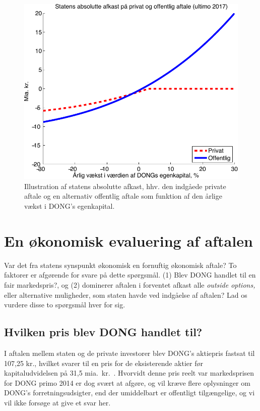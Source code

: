 \documentclass{article}
\begin{document}
\begin{figure}
\caption{Illustration af statens absolutte afkast, hhv. den indg\aa{}ede private aftale og en alternativ offentlig aftale som funktion af den \aa{}rlige v\ae{}kst i DONG's egenkapital. }
\label{fig:privat_off}
\centerline{\includegraphics[scale=0.8]{../matlab/figs/private_public_deal_guan}}
\end{figure}


\section{En økonomisk evaluering af aftalen}

Var det fra statens synspunkt økonomisk en fornuftig økonomisk aftale? To faktorer er afgørende for svare på dette spørgsmål. (1) Blev DONG handlet til en fair markedspris?, og (2) dominerer aftalen i forventet afkast  alle \emph{outside options,} eller alternative muligheder, som staten havde ved indgåelse af aftalen? Lad os vurdere disse to spørgsmål hver for sig.

\subsection{Hvilken pris blev DONG handlet til?}

I aftalen mellem staten og de private investorer blev  DONG's aktiepris fastsat til 107,25 kr., hvilket svarer til en pris for de eksisterende aktier før kapitaludvidelsen på 31,5 mia.\ kr.\ \citep{FM2013a}. Hvorvidt denne pris reelt var markedsprisen for DONG primo 2014 er dog svært at afgøre, og vil kræve flere oplysninger om DONG's forretningsudsigter, end der umiddelbart er offentligt tilgængelige, og vi vil ikke forsøge at give et svar her. 
\end{document}
